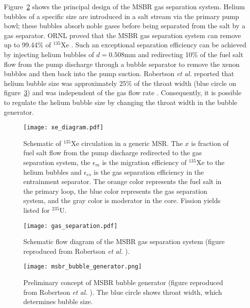 Figure~\ref{fig:gas_removal_system} shows the principal design of the  
\gls{MSBR} gas separation system. Helium bubbles of a specific size are 
introduced in a salt stream via the primary pump bowl; these bubbles absorb 
noble gases before being separated from the salt by a gas separator. 
\gls{ORNL} proved that the \gls{MSBR} gas separation system can remove up to 
99.44\% of $^{135}$Xe \cite{briggs_molten-salt_1969}. Such an exceptional 
separation efficiency can be achieved by injecting helium bubbles of 
$d=0.508$mm and redirecting 10\% of the fuel salt flow from the pump discharge 
through a bubble separator to remove the xenon bubbles and then back into the 
pump suction. Robertson \emph{et al.} reported that helium bubble size was 
approximately 25\% of the throat width (blue circle on 
figure~\ref{fig:bubble_separator}) and was independent of the gas flow rate 
\cite{robertson_conceptual_1971}. Consequently, it is possible to regulate the 
helium bubble size by changing the throat width in the bubble generator.
\begin{figure}[htp!] %
	\centering
	\texttt{[image: xe\_diagram.pdf]}
	\caption{Schematic of $^{135}$Xe circulation in a generic \gls{MSR}. The 
	$x$ is fraction of fuel salt flow from the pump discharge redirected to 
	the gas separation system, the $\epsilon_m$ is the migration efficiency of 
	$^{135}$Xe to the helium bubbles and $\epsilon_{es}$ is the gas separation 
	efficiency in the entrainment separator. The orange color represents the 
	fuel salt in the primary loop,	the blue color represents the gas 
	separation system, and the gray color is moderator in the core. Fission 
	yields listed for $^{235}$U.}
	\label{fig:xe_diagram}
\end{figure}
\begin{figure}[htp!] %
  \centering
  \texttt{[image: gas\_separation.pdf]}
  \caption{Schematic flow diagram of the \gls{MSBR} gas separation system 
  (figure reproduced from Robertson \emph{et al.} 
  \cite{robertson_conceptual_1971}).}
  \label{fig:gas_removal_system}
\end{figure}
\begin{figure}[htp!] %
  \centering
  \texttt{[image: msbr\_bubble\_generator.png]}
  \caption{Preliminary concept of \gls{MSBR} bubble generator (figure 
  reproduced from Robertson \emph{et al.} \cite{robertson_conceptual_1971}). 
  The blue circle shows throat width, which determines bubble size.}
		\vspace{-0.25in}
  \label{fig:bubble_separator}
\end{figure}
